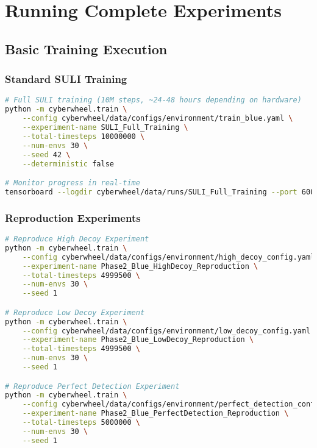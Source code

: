 \documentclass[12pt,a4paper]{article}
\begin{document}
\section{Running Complete Experiments}

\subsection{Basic Training Execution}

\subsubsection{Standard SULI Training}
\begin{lstlisting}[language=bash, caption=Standard SULI Training Run]
# Full SULI training (10M steps, ~24-48 hours depending on hardware)
python -m cyberwheel.train \
    --config cyberwheel/data/configs/environment/train_blue.yaml \
    --experiment-name SULI_Full_Training \
    --total-timesteps 10000000 \
    --num-envs 30 \
    --seed 42 \
    --deterministic false

# Monitor progress in real-time
tensorboard --logdir cyberwheel/data/runs/SULI_Full_Training --port 6006
\end{lstlisting}

\subsubsection{Reproduction Experiments}
\begin{lstlisting}[language=bash, caption=Reproduce Key Experiments]
# Reproduce High Decoy Experiment
python -m cyberwheel.train \
    --config cyberwheel/data/configs/environment/high_decoy_config.yaml \
    --experiment-name Phase2_Blue_HighDecoy_Reproduction \
    --total-timesteps 4999500 \
    --num-envs 30 \
    --seed 1

# Reproduce Low Decoy Experiment  
python -m cyberwheel.train \
    --config cyberwheel/data/configs/environment/low_decoy_config.yaml \
    --experiment-name Phase2_Blue_LowDecoy_Reproduction \
    --total-timesteps 4999500 \
    --num-envs 30 \
    --seed 1

# Reproduce Perfect Detection Experiment
python -m cyberwheel.train \
    --config cyberwheel/data/configs/environment/perfect_detection_config.yaml \
    --experiment-name Phase2_Blue_PerfectDetection_Reproduction \
    --total-timesteps 5000000 \
    --num-envs 30 \
    --seed 1
\end{lstlisting}
\end{document}
